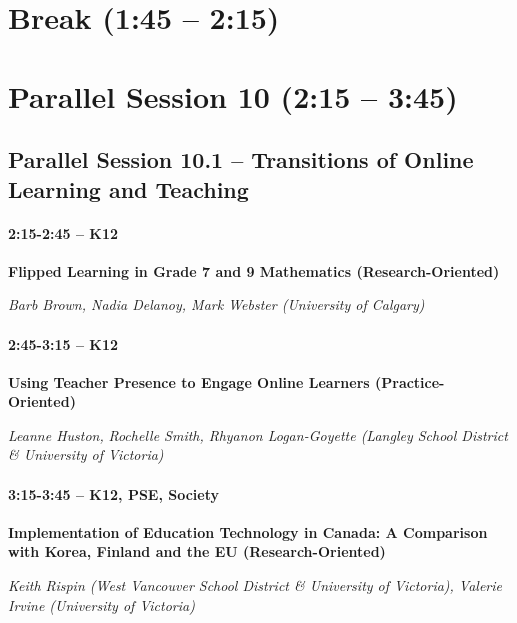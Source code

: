 \documentclass[
]{book}
\begin{document}
\hypertarget{break-145-215-2}{%
\section*{Break (1:45 -- 2:15)}\label{break-145-215-2}}

\hypertarget{parallel-session-10-215-345}{%
\section*{Parallel Session 10 (2:15 -- 3:45)}\label{parallel-session-10-215-345}}

\hypertarget{parallel-session-10.1-transitions-of-online-learning-and-teaching}{%
\subsection*{Parallel Session 10.1 -- Transitions of Online Learning and Teaching}\label{parallel-session-10.1-transitions-of-online-learning-and-teaching}}

\begin{secondary}
\hypertarget{k12}{%
\paragraph{2:15-2:45 -- K12}\label{k12}}

\textbf{Flipped Learning in Grade 7 and 9 Mathematics
(Research-Oriented)}

\emph{Barb Brown, Nadia Delanoy, Mark Webster (University of Calgary)}
\end{secondary}

\begin{secondary}
\hypertarget{k12}{%
\paragraph{2:45-3:15 -- K12}\label{k12}}

\textbf{Using Teacher Presence to Engage Online Learners
(Practice-Oriented)}

\emph{Leanne Huston,} \emph{Rochelle Smith, Rhyanon Logan-Goyette
(Langley School District \& University of Victoria)}
\end{secondary}

\begin{secondary}
\hypertarget{k12-pse-society}{%
\paragraph{3:15-3:45 -- K12, PSE, Society}\label{k12-pse-society}}

\textbf{Implementation of Education Technology in Canada: A Comparison
with Korea, Finland and the EU (Research-Oriented)}

\emph{Keith Rispin (West Vancouver School District \& University of
Victoria), Valerie Irvine (University of Victoria)}
\end{secondary}
\end{document}
